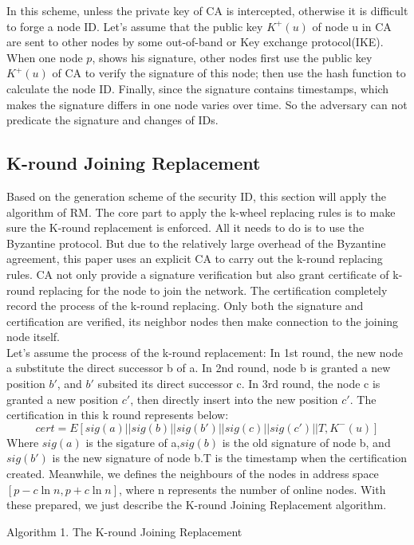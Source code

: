\documentclass[10pt]{article}
\begin{document}
In this scheme,  unless the private key of CA is intercepted, otherwise  it is difficult to forge a node ID. Let's assume that the public key \(K^+(u)\) of node u in CA are sent to other nodes by some out-of-band or Key exchange protocol(IKE). When one node \(p\), shows his signature, other nodes first use the public key \(K^+(u)\) of CA to verify the signature of this node; then use the hash function to calculate the node ID. Finally, since the signature contains timestamps, which makes the signature differs in one node varies over time. So the adversary can not predicate the signature and changes of IDs.
\subsection{K-round Joining Replacement}
Based on the generation scheme of the security ID, this section will apply the algorithm of RM.  The core part to apply the k-wheel replacing rules is to make sure the K-round replacement is enforced.  All it needs to do is to use the Byzantine protocol. But due to the relatively large overhead of the Byzantine agreement, this paper uses an explicit CA to carry out the k-round replacing rules. CA not only provide a signature verification but also grant certificate of k-round replacing for the node to join the network. The certification completely record the process of the k-round replacing. Only both the signature and certification are verified, its neighbor nodes then make connection to the joining node itself.\\
Let's assume the process of the k-round replacement: In 1st round, the new node a substitute the direct successor b of a. In 2nd round, node b is granted a new position \(b'\), and \(b'\) subsited its direct successor c. In 3rd round, the node c is granted a new position \(c'\), then directly insert into the new position \(c'\). The certification in this k round represents below:
\begin{equation}
    cert=E[sig(a)||sig(b)||sig(b')||sig(c)||sig(c')||T,K^-(u)]
\end{equation}
Where $sig(a)$ is the sigature of a,$sig(b)$ is the old signature of node b, and $sig(b')$ is the new signature of node b.T is the timestamp when the certification created. Meanwhile, we defines the neighbours of the nodes in address space $[p-c\ln{n},p+c\ln{n}]$, where n represents the number of online nodes.  With these prepared, we just describe the K-round Joining Replacement algorithm.\\
\begin{center}
    Algorithm 1. The K-round Joining Replacement
\end{center}
\end{document}
